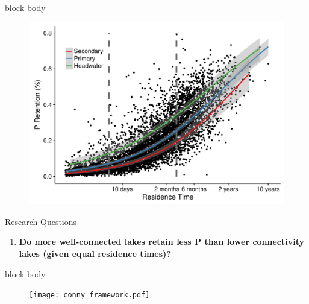 \documentclass[final,hyperref={pdfpagelabels=false}]{beamer}
\begin{document}
\begin{frame}[t]
\begin{columns}[t]
\begin{column}{.465\textwidth}
{
\begin{beamercolorbox}[wd=\textwidth,rounded=true]{block body}
   \begin{figure}
      \includegraphics[width=\linewidth]{milstead_multi.pdf}
   \end{figure}
\end{beamercolorbox}
}

\vspace{1em}
\begin{block}{Research Questions}

\vspace{1em}

\begin{enumerate} \large 
\item \textbf{Do more well-connected lakes retain less P than lower connectivity lakes (given equal residence times)?}
\end{enumerate}
\end{block}

{
\begin{beamercolorbox}[wd=\textwidth,rounded=true]{block body}

\begin{figure}
  \texttt{[image: conny\_framework.pdf]}
\end{figure}


\end{beamercolorbox}}
\end{column}
\end{columns}
\end{frame}
\end{document}
